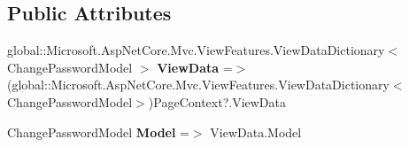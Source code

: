 \subsection*{Public Attributes}
\begin{DoxyCompactItemize}
\item 
\mbox{\label{class_projeto_e_s_w_1_1_areas_1_1_identity_1_1_pages_1_1_account_1_1_manage_1_1_areas___identityf71e623a7e7907515cd465c2fe005b76_ae78b26fe97b97e5ca9fcc7f864a94e84}} 
global\+::\+Microsoft.\+Asp\+Net\+Core.\+Mvc.\+View\+Features.\+View\+Data\+Dictionary$<$ Change\+Password\+Model $>$ {\bfseries View\+Data} =$>$ (global\+::\+Microsoft.\+Asp\+Net\+Core.\+Mvc.\+View\+Features.\+View\+Data\+Dictionary$<$Change\+Password\+Model$>$)Page\+Context?.View\+Data
\item 
\mbox{\label{class_projeto_e_s_w_1_1_areas_1_1_identity_1_1_pages_1_1_account_1_1_manage_1_1_areas___identityf71e623a7e7907515cd465c2fe005b76_a7f158ff13a7d5695b0b234f847007be8}} 
Change\+Password\+Model {\bfseries Model} =$>$ View\+Data.\+Model
\end{DoxyCompactItemize}
